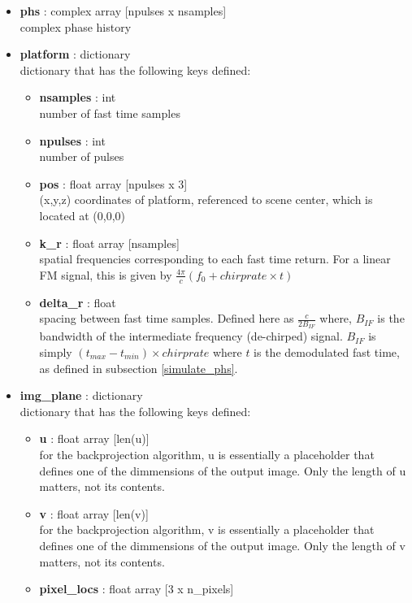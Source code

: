\documentclass{article}
\newcommand{\defs}[2]{\textbf{{#1}} : {#2}}
\begin{document}
\begin{itemize}
	\item \defs{phs}{complex array [npulses x nsamples]}\\
  	complex phase history
  	\item \defs{platform}{dictionary}\\
  	dictionary that has the following keys defined:
	\begin{itemize}
    	\item \defs{nsamples}{int}\\
    		number of fast time samples
	    \item \defs{npulses}{int}\\
	    	number of pulses
	    \item \defs{pos}{float array [npulses x 3]}\\
	       	(x,y,z) coordinates of platform, referenced to scene center, which is located at (0,0,0)
		\item\defs{k\_r}{float array [nsamples]}\\
	    	spatial frequencies corresponding to each fast time return.  For a linear FM signal, this is given by $\frac{4\pi}{c}(f_0+chirprate\times t)$
    	\item \defs{delta\_r}{float}\\
    	   	spacing between fast time samples.  Defined here as $\frac{c}{2B_{IF}}$ where, $B_{IF}$ is the bandwidth of the intermediate frequency (de-chirped) signal.  $B_{IF}$ is simply $(t_{max}-t_{min})\times chirprate$ where $t$ is the demodulated fast time, as defined in subsection \ref{simulate_phs}.
	\end{itemize}
  	\item \defs{img\_plane}{dictionary}\\
  	dictionary that has the following keys defined:
	\begin{itemize}
	    \item \defs{u}{float array [len(u)]}\\
	    	for the backprojection algorithm, u is essentially a placeholder that defines one of the dimmensions of the output image.  Only the length of u matters, not its contents.
	    \item \defs{v}{float array [len(v)]}\\
	    	for the backprojection algorithm, v is essentially a placeholder that defines one of the dimmensions of the output image.  Only the length of v matters, not its contents.
	    \item \defs{pixel\_locs}{float array [3 x n\_pixels]}\\

\end{itemize}
\end{itemize}
\end{document}
